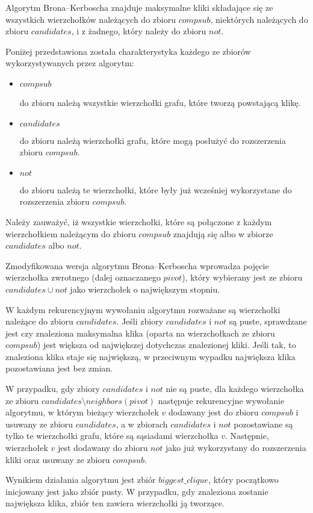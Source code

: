 \documentclass[12pt, a4paper]{article}
\begin{document}
Algorytm Brona--Kerboscha znajduje maksymalne kliki składające się ze wszystkich wierzchołków należących do zbioru $compsub$, niektórych należących do zbioru $candidates$, i z żadnego, który należy do zbioru $not$.

Poniżej przedstawiona została charakterystyka każdego ze zbiorów wykorzystywanych przez algorytm:
\begin{itemize}
	\item $compsub$ 
	
	do zbioru należą wszystkie wierzchołki grafu, które tworzą powstającą klikę.
	\item $candidates$
	
	do zbioru należą wierzchołki grafu, które mogą posłużyć do rozszerzenia zbioru $compsub$.
	\item $not$ 
	
	do zbioru należą te wierzchołki, które były już wcześniej wykorzystane do rozszerzenia zbioru $compsub$.
\end{itemize}

Należy zauważyć, iż wszystkie wierzchołki, które są połączone z każdym wierzchołkiem należącym do zbioru $compsub$ znajdują się albo w zbiorze $candidates$ albo $not$.

\bigskip
Zmodyfikowana wersja algorytmu Brona--Kerboscha wprowadza pojęcie wierzchołka zwrotnego (dalej oznaczanego $pivot$), który wybierany jest ze zbioru $candidates \cup not$ jako wierzchołek o największym stopniu.

\bigskip
W każdym rekurencyjnym wywołaniu algorytmu rozważane są wierzchołki należące do zbioru $candidates$. Jeśli zbiory $candidates$ i $not$ są puste, sprawdzane jest czy znaleziona maksymalna klika (oparta na wierzchołkach ze zbioru $compsub$) jest większa od największej dotychczas znalezionej kliki. Jeśli tak, to znaleziona klika staje się największą, w przeciwnym wypadku największa klika pozostawiana jest bez zmian.

W przypadku, gdy zbiory $candidates$ i $not$ nie są puste, dla każdego wierzchołka ze zbioru $candidates \setminus neighbors(pivot)$ następuje rekurencyjne wywołanie algorytmu, w którym bieżący wierzchołek $v$ dodawany jest do zbioru $compsub$ i usuwany ze zbioru $candidates$, a w zbiorach $candidates$ i $not$ pozostawiane są tylko te wierzchołki grafu, które są sąsiadami wierzchołka $v$. Następnie, wierzchołek $v$ jest dodawany do zbioru $not$ jako już wykorzystany do rozszerzenia kliki oraz usuwany ze zbioru $compsub$.

Wynikiem działania algorytmu jest zbiór $biggest\_clique$, który początkowo inicjowany jest jako zbiór pusty. W przypadku, gdy znaleziona zostanie największa klika, zbiór ten zawiera wierzchołki ją tworzące.
\end{document}
